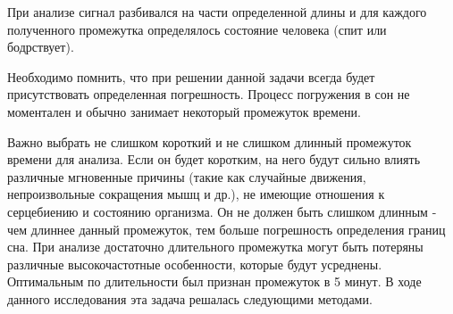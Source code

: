 При анализе сигнал разбивался на части определенной длины и для каждого полученного промежутка определялось состояние человека (спит или бодрствует). 

Необходимо помнить, что при решении данной задачи всегда будет присутствовать определенная погрешность. Процесс погружения в сон не моментален и обычно занимает некоторый промежуток времени.

Важно выбрать не слишком короткий и не слишком длинный промежуток времени для анализа. Если он будет коротким, на него будут сильно влиять различные мгновенные причины (такие как случайные движения, непроизвольные сокращения мышц и др.), не имеющие отношения к серцебиению и состоянию организма. Он не должен быть слишком длинным - чем длиннее данный промежуток, тем больше погрешность определения границ сна. При анализе достаточно длительного промежутка могут быть потеряны различные высокочастотные особенности, которые будут усреднены. Оптимальным по длительности был признан промежуток в 5 минут.
В ходе данного исследования эта задача решалась следующими методами.
